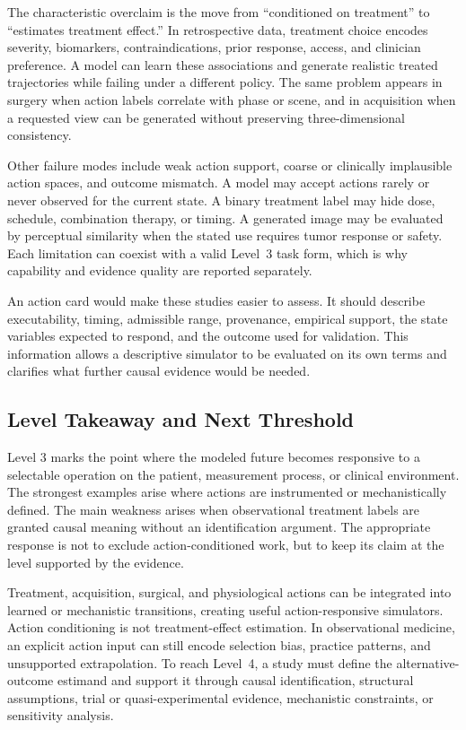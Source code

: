 The characteristic overclaim is the move from ``conditioned on treatment'' to ``estimates treatment effect.'' In retrospective data, treatment choice encodes severity, biomarkers, contraindications, prior response, access, and clinician preference. A model can learn these associations and generate realistic treated trajectories while failing under a different policy. The same problem appears in surgery when action labels correlate with phase or scene, and in acquisition when a requested view can be generated without preserving three-dimensional consistency.

Other failure modes include weak action support, coarse or clinically implausible action spaces, and outcome mismatch. A model may accept actions rarely or never observed for the current state. A binary treatment label may hide dose, schedule, combination therapy, or timing. A generated image may be evaluated by perceptual similarity when the stated use requires tumor response or safety. Each limitation can coexist with a valid Level~3 task form, which is why capability and evidence quality are reported separately.

An action card would make these studies easier to assess. It should describe executability, timing, admissible range, provenance, empirical support, the state variables expected to respond, and the outcome used for validation. This information allows a descriptive simulator to be evaluated on its own terms and clarifies what further causal evidence would be needed.

\subsection{Level Takeaway and Next Threshold}

Level 3 marks the point where the modeled future becomes responsive to a selectable operation on the patient, measurement process, or clinical environment. The strongest examples arise where actions are instrumented or mechanistically defined. The main weakness arises when observational treatment labels are granted causal meaning without an identification argument. The appropriate response is not to exclude action-conditioned work, but to keep its claim at the level supported by the evidence.

\levelsummary
{Treatment, acquisition, surgical, and physiological actions can be integrated into learned or mechanistic transitions, creating useful action-responsive simulators.}
{Action conditioning is not treatment-effect estimation. In observational medicine, an explicit action input can still encode selection bias, practice patterns, and unsupported extrapolation.}
{To reach Level~4, a study must define the alternative-outcome estimand and support it through causal identification, structural assumptions, trial or quasi-experimental evidence, mechanistic constraints, or sensitivity analysis.}
